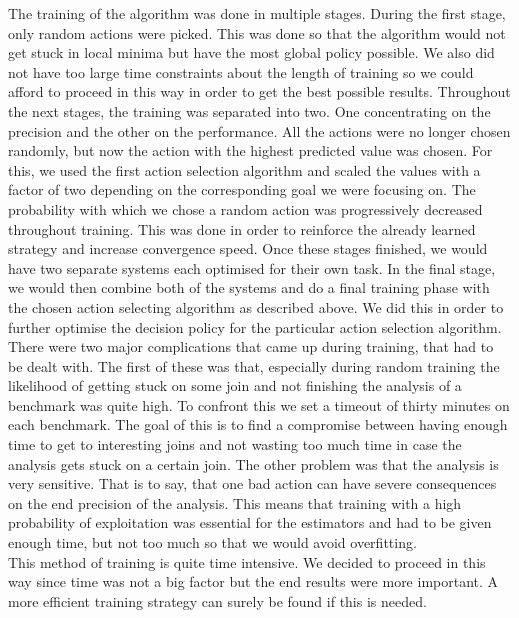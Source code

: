 The training of the algorithm was done in multiple stages. During the first stage, only random actions were picked. This was done so that the algorithm would not get stuck in local minima but have the most global policy possible. We also did not have too large time constraints about the length of training so we could afford to proceed in this way in order to get the best possible results. Throughout the next stages, the training was separated into two. One concentrating on the precision and the other on the performance. All the actions were no longer chosen randomly, but now the action with the highest predicted value was chosen. For this, we used the first action selection algorithm and scaled the values with a factor of two depending on the corresponding goal we were focusing on. The probability with which we chose a random action was progressively decreased throughout training. This was done in order to reinforce the already learned strategy and increase convergence speed. Once these stages finished, we would have two separate systems each optimised for their own task. In the final stage, we would then combine both of the systems and do a final training phase with the chosen action selecting algorithm as described above. We did this in order to further optimise the decision policy for the particular action selection algorithm.\\
There were two major complications that came up during training, that had to be dealt with. The first of these was that, especially during random training the likelihood of getting stuck on some join and not finishing the analysis of a benchmark was quite high. To confront this we set a timeout of thirty minutes on each benchmark. The goal of this is to find a compromise between having enough time to get to interesting joins and not wasting too much time in case the analysis gets stuck on a certain join. The other problem was that the analysis is very sensitive. That is to say, that one bad action can have severe consequences on the end precision of the analysis. This means that training with a high probability of exploitation was essential for the estimators and had to be given enough time, but not too much so that we would avoid overfitting.\\
This method of training is quite time intensive. We decided to proceed in this way since time was not a big factor but the end results were more important. A more efficient training strategy can surely be found if this is needed.



















